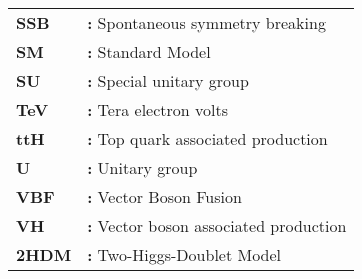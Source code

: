 \begin{tabular}{@{}p{2cm}l}
{\bf SSB} & {\bf:} Spontaneous symmetry breaking\\
{\bf SM} & {\bf:} Standard Model\\
{\bf SU} & {\bf:} Special unitary group\\
{\bf TeV} & {\bf:} Tera electron volts\\
{\bf ttH} & {\bf:} Top quark associated production\\
{\bf U} & {\bf:} Unitary group\\
{\bf VBF} & {\bf:} Vector Boson Fusion\\
{\bf VH} & {\bf:} Vector boson associated production\\
{\bf 2HDM} & {\bf:} Two-Higgs-Doublet Model\\
\end{tabular}
